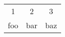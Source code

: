 \documentclass{article}
\begin{document}
    \begin{tabular}{ c c c }
1 & 2 & 3 \\
foo & bar & baz \\
\end{tabular}
    
\end{document}
